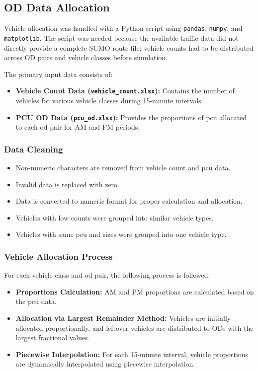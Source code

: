 \subsection{OD Data Allocation}
\label{subsec:od_allocation}
Vehicle allocation was handled with a Python script using \texttt{pandas}, \texttt{numpy}, and \texttt{matplotlib}. The script was needed because the available traffic data did not directly provide a complete SUMO route file; vehicle counts had to be distributed across OD pairs and vehicle classes before simulation.

The primary input data consists of:
\begin{itemize}
    \item \textbf{Vehicle Count Data (\texttt{vehicle\_count.xlsx}):} Contains the number of vehicles for various vehicle classes during 15-minute intervals.
    \item \textbf{PCU OD Data (\texttt{pcu\_od.xlsx}):} Provides the proportions of \gls{pcu} allocated to each \gls{od} pair for AM and PM periods.
\end{itemize}

\subsubsection{Data Cleaning}
\begin{itemize}
    \item Non-numeric characters are removed from vehicle count and \gls{pcu} data.
    \item Invalid data is replaced with zero.
    \item Data is converted to numeric format for proper calculation and allocation.
    \item Vehicles with low counts were grouped into similar vehicle types.
    \item Vehicles with same \gls{pcu} and sizes were grouped into one vehicle type.
\end{itemize}

\subsubsection{Vehicle Allocation Process}
For each vehicle class and \gls{od} pair, the following process is followed:
\begin{itemize}
    \item \textbf{Proportions Calculation:} AM and PM proportions are calculated based on the \gls{pcu} data.
    \item \textbf{Allocation via Largest Remainder Method:} Vehicles are initially allocated proportionally, and leftover vehicles are distributed to ODs with the largest fractional values.
    \item \textbf{Piecewise Interpolation:} For each 15-minute interval, vehicle proportions are dynamically interpolated using piecewise interpolation.
\end{itemize}

